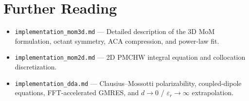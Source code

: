 \documentclass[a4paper,11pt]{article}
\begin{document}
\section{Further Reading}

\begin{itemize}
    \item \texttt{implementation\_mom3d.md} — Detailed description of the 3D
          MoM formulation, octant symmetry, ACA compression, and power-law fit.
    \item \texttt{implementation\_mom2d.md} — 2D PMCHW integral equation and
          collocation discretization.
    \item \texttt{implementation\_dda.md} — Clausius--Mossotti polarizability,
          coupled-dipole equations, FFT-accelerated GMRES, and $d \to 0$ /
          $\varepsilon_r \to \infty$ extrapolation.
\end{itemize}
\end{document}
